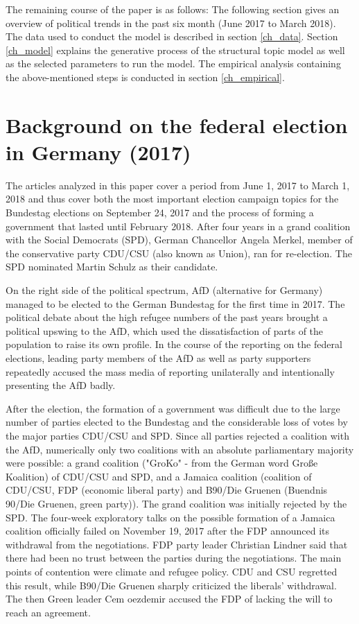 \documentclass[12pt,a4paper,notitlepage]{article}
\begin{document}
The remaining course of the paper is as follows: The following section gives an overview of political trends in the past six month (June 2017 to March 2018). The data used to conduct the model is described in section \ref{ch_data}. Section \ref{ch_model} explains the generative process of the structural topic model as well as the selected parameters to run the model. The empirical analysis containing the above-mentioned steps is conducted in section \ref{ch_empirical}. 
 
\section{Background on the federal election in Germany (2017)}\label{ch_elections}

The articles analyzed in this paper cover a period from June 1, 2017 to March 1, 2018 and thus cover both the most important election campaign topics for the Bundestag elections on September 24, 2017 and the process of forming a government that lasted until February 2018. After four years in a grand coalition with the Social Democrats (SPD), German Chancellor Angela Merkel, member of the conservative party CDU/CSU (also known as Union), ran for re-election. The SPD nominated Martin Schulz as their candidate. 

On the right side of the political spectrum, AfD (alternative for Germany) managed to be elected to the German Bundestag for the first time in 2017. The political debate about the high refugee numbers of the past years brought a political upswing to the AfD, which used the dissatisfaction of parts of the population to raise its own profile. In the course of the reporting on the federal elections, leading party members of the AfD as well as party supporters repeatedly accused the mass media of reporting unilaterally and intentionally presenting the AfD badly.

After the election, the formation of a government was difficult due to the large number of parties elected to the Bundestag and the considerable loss of votes by the major parties CDU/CSU and SPD. Since all parties rejected a coalition with the AfD, numerically only two coalitions with an absolute parliamentary majority were possible: a grand coalition ("GroKo" - from the German word Große Koalition) of CDU/CSU and SPD, and a Jamaica coalition (coalition of CDU/CSU, FDP (economic liberal party) and B90/Die Gruenen (Buendnis 90/Die Gruenen, green party)). The grand coalition was initially rejected by the SPD. The four-week exploratory talks on the possible formation of a Jamaica coalition officially failed on November 19, 2017 after the FDP announced its withdrawal from the negotiations. FDP party leader Christian Lindner said that there had been no trust between the parties during the negotiations. The main points of contention were climate and refugee policy. CDU and CSU regretted this result, while B90/Die Gruenen sharply criticized the liberals' withdrawal. The then Green leader Cem oezdemir accused the FDP of lacking the will to reach an agreement.
\end{document}
